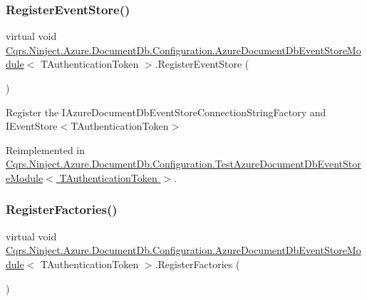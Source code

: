 \subsubsection{\texorpdfstring{Register\+Event\+Store()}{RegisterEventStore()}}
{\footnotesize\ttfamily virtual void \hyperlink{classCqrs_1_1Ninject_1_1Azure_1_1DocumentDb_1_1Configuration_1_1AzureDocumentDbEventStoreModule}{Cqrs.\+Ninject.\+Azure.\+Document\+Db.\+Configuration.\+Azure\+Document\+Db\+Event\+Store\+Module}$<$ T\+Authentication\+Token $>$.Register\+Event\+Store (\begin{DoxyParamCaption}{ }\end{DoxyParamCaption})\hspace{0.3cm}{\ttfamily [virtual]}}



Register the I\+Azure\+Document\+Db\+Event\+Store\+Connection\+String\+Factory and I\+Event\+Store$<$\+T\+Authentication\+Token$>$ 



Reimplemented in \hyperlink{classCqrs_1_1Ninject_1_1Azure_1_1DocumentDb_1_1Configuration_1_1TestAzureDocumentDbEventStoreModule_a2b3e6c1f8edd6aa4101b98df7d1be93e_a2b3e6c1f8edd6aa4101b98df7d1be93e}{Cqrs.\+Ninject.\+Azure.\+Document\+Db.\+Configuration.\+Test\+Azure\+Document\+Db\+Event\+Store\+Module$<$ T\+Authentication\+Token $>$}.

\mbox{\label{classCqrs_1_1Ninject_1_1Azure_1_1DocumentDb_1_1Configuration_1_1AzureDocumentDbEventStoreModule_a877c0ec79b109c14b0b6f950b643d9a8_a877c0ec79b109c14b0b6f950b643d9a8}} 
\subsubsection{\texorpdfstring{Register\+Factories()}{RegisterFactories()}}
{\footnotesize\ttfamily virtual void \hyperlink{classCqrs_1_1Ninject_1_1Azure_1_1DocumentDb_1_1Configuration_1_1AzureDocumentDbEventStoreModule}{Cqrs.\+Ninject.\+Azure.\+Document\+Db.\+Configuration.\+Azure\+Document\+Db\+Event\+Store\+Module}$<$ T\+Authentication\+Token $>$.Register\+Factories (\begin{DoxyParamCaption}{ }\end{DoxyParamCaption})\hspace{0.3cm}{\ttfamily [virtual]}}




